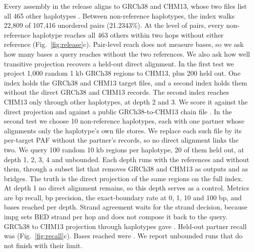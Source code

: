 Every assembly in the release aligns to GRCh38 and CHM13, whose two files list all 465 other haplotypes \citep{Schneider2017grch38,Nurk2022chm13}.
Between non-reference haplotypes, the index walks 22,809 of 107,416 unordered pairs (21.2343\%).
At the level of pairs, every non-reference haplotype reaches all 463 others within two hops without either reference (Fig.~\ref{fig:release}c).
Pair-level reach does not measure bases, so we ask how many bases a query reaches without the two references.
We also ask how well transitive projection recovers a held-out direct alignment.
In the first test we project 1,000 random 1 kb GRCh38 regions to CHM13, plus 200 held out.
One index holds the GRCh38 and CHM13 target files, and a second index holds them without the direct GRCh38 and CHM13 records.
The second index reaches CHM13 only through other haplotypes, at depth 2 and 3.
We score it against the direct projection and against a public GRCh38-to-CHM13 chain file \citep{Kent2003chain} .
In the second test we choose 10 non-reference haplotypes, each with one partner whose alignments only the haplotype's own file stores.
We replace each such file by its per-target PAF without the partner's records, so no direct alignment links the two.
We query 100 random 10 kb regions per haplotype, 20 of them held out, at depth 1, 2, 3, 4 and unbounded.
Each depth runs with the references and without them, through a subset list that removes GRCh38 and CHM13 as outputs and as bridges.
The truth is the direct projection of the same regions on the full index.
At depth 1 no direct alignment remains, so this depth serves as a control.
Metrics are bp recall, bp precision, the exact-boundary rate at 0, 1, 10 and 100 bp, and bases reached per depth.
Strand agreement waits for the strand decision, because impg sets BED strand per hop and does not compose it back to the query.
GRCh38 to CHM13 projection through haplotypes gave .
Held-out partner recall was  (Fig.~\ref{fig:recall}c).
Bases reached were  .
We report unbounded runs that do not finish with their limit.

